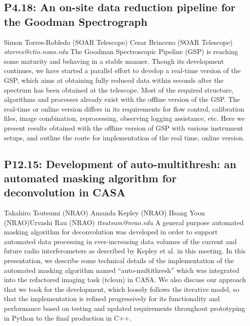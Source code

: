 \documentclass{report}
\begin{document}
\subsection*{P4.18: An on-site data reduction pipeline for the Goodman Spectrograph}
\bigskip
Simon Torres-Robledo (SOAR Telescope) \newline Cesar Brinceno (SOAR Telescope) \newline   \newline   \newline  \newline  \newline\newline
{\it storres@ctio.noao.edu}\newline
\newline\newline
The Goodman Spectroscopic Pipeline (GSP) is reaching some maturity and
behaving in a stable manner. Though its development continues, we have
started a parallel effort to develop a real-time version of the GSP,
which aims at obtaining fully reduced data within seconds after the spectrum
has been obtained at the telescope.  Most of the required structure, algorithms and
processes already exist with the offline version of the GSP. The real-time or online
version differs in its requirements for flow control, calibration files, image combination, reprocessing, observing logging assistance, etc.
Here we present results obtained with the offline version of GSP with various instrument setups, and outline the route for implementation of the real time, online version.\newline
\newpage
\subsection*{P12.15: Development of auto-multithresh: an automated masking algorithm for deconvolution in CASA}
\bigskip
Takahiro Tsutsumi (NRAO) \newline Amanda Kepley (NRAO) \newline  IIsang Yoon (NRAO)\newline  Urvashi Rau (NRAO)\newline  \newline  \newline\newline
{\it ttsutsum@nrao.edu}\newline
\newline\newline
A general purpose automated masking algorithm for deconvolution was developed in order to support automated data processing in ever-increasing data volumes of the current and future radio interferometers as described by Kepley et al. in this meeting. In this presentation, we describe some technical details of the implementation of the automated masking algorithm named “auto-multithresh” which was integrated into the refactored imaging task (tclean) in CASA.
We also discuss our approach that we took for the development, which loosely follows the iterative model, so that the implementation is refined progressively
for its functionality and performance based on testing and updated requirements throughout prototyping in Python to the final production in C++.\newline
\newpage
\end{document}
